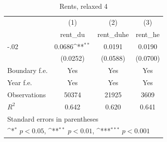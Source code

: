 \begin{table}[htbp]\centering
\def\sym#1{\ifmmode^{#1}\else\(^{#1}\)\fi}
\caption{Rents, relaxed 4}
\begin{tabular}{l*{3}{c}}
\hline\hline
                    &\multicolumn{1}{c}{(1)}&\multicolumn{1}{c}{(2)}&\multicolumn{1}{c}{(3)}\\
                    &\multicolumn{1}{c}{rent\_du}&\multicolumn{1}{c}{rent\_duhe}&\multicolumn{1}{c}{rent\_he}\\
\hline
-.02                &      0.0686\sym{**} &      0.0191         &      0.0190         \\
                    &    (0.0252)         &    (0.0588)         &    (0.0700)         \\
[1em]
Boundary f.e.       &         Yes         &         Yes         &         Yes         \\
[1em]
Year f.e.           &         Yes         &         Yes         &         Yes         \\
\hline
Observations        &       50374         &       21925         &        3609         \\
\(R^{2}\)           &       0.642         &       0.620         &       0.641         \\
\hline\hline
\multicolumn{4}{l}{\footnotesize Standard errors in parentheses}\\
\multicolumn{4}{l}{\footnotesize \sym{*} \(p<0.05\), \sym{**} \(p<0.01\), \sym{***} \(p<0.001\)}\\
\end{tabular}
\end{table}

